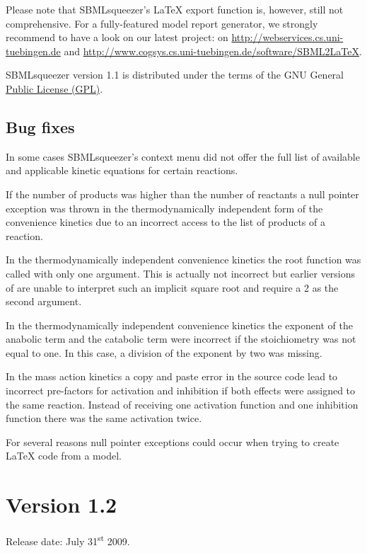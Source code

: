 Please note that SBMLsqueezer's \LaTeX{} export function is, however, still not
comprehensive. For a fully-featured model report generator, we strongly recommend
to have a look on our latest project: \SBMLLaTeX on
\url{http://webservices.cs.uni-tuebingen.de} and
\url{http://www.cogsys.cs.uni-tuebingen.de/software/SBML2LaTeX}.

SBMLsqueezer version 1.1 is distributed under the terms of the GNU General
\href{http://www.gnu.org/licenses/gpl.html}{Public License (GPL)}.

\subsection{Bug fixes}

In some cases SBMLsqueezer's context menu did not offer the full list of
available and applicable kinetic equations for certain reactions.

If the number of products was higher than the number of reactants a null pointer
exception was thrown in the thermodynamically independent form of the
convenience kinetics due to an incorrect access to the list of products of a
reaction.

In the thermodynamically independent convenience kinetics the root function was
called with only one argument. This is actually not incorrect but earlier
versions of \libSBML are unable to interpret such an implicit square root and
require a 2 as the second argument.

In the thermodynamically independent convenience kinetics the exponent of the
anabolic term and the catabolic term were incorrect if the stoichiometry was not
equal to one. In this case, a division of the exponent by two was missing.

In the mass action kinetics a copy and paste error in the source code lead to
incorrect pre-factors for activation and inhibition if both effects were
assigned to the same reaction. Instead of receiving one activation function and
one inhibition function there was the same activation twice.

For several reasons null pointer exceptions could occur when trying to create
\LaTeX{} code from a model.


\section{Version 1.2}

Release date: July 31\textsuperscript{st} 2009.

